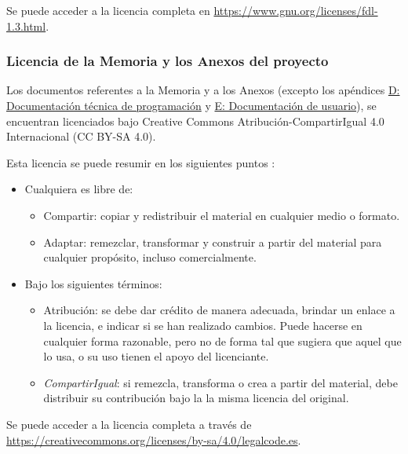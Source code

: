 Se puede acceder a la licencia completa en \href{https://www.gnu.org/licenses/fdl-1.3.html}{https://www.gnu.org/licenses/\newline fdl-1.3.html}.


\subsubsection{Licencia de la Memoria y los Anexos del proyecto}

Los documentos referentes a la Memoria y a los Anexos (excepto los apéndices  \hyperref[apendice:programador]{D:  Documentación técnica de programación} y \hyperref[apendice:usuario]{E: Documentación de usuario}), se encuentran licenciados bajo Creative Commons Atribución-CompartirIgual 4.0 Internacional (CC BY-SA 4.0).

Esta licencia se puede resumir en los siguientes puntos \cite{creative-commons}:

\vspace{-0.2cm}
\begin{itemize} [\textbullet]
	\item Cualquiera es libre de:
	\begin{itemize} [◦]
		\item Compartir: copiar y redistribuir el material en cualquier medio o formato.
		
		\item  Adaptar: remezclar, transformar y construir a partir del material para cualquier propósito, incluso comercialmente. 
	\end{itemize}
	\item Bajo los siguientes términos:
	\begin{itemize} [◦]
		\item Atribución: se debe dar crédito de manera adecuada, brindar un enlace a la licencia, e indicar si se han realizado cambios. Puede hacerse en cualquier forma razonable, pero no de forma tal que sugiera que aquel que lo usa, o su uso tienen el apoyo del licenciante.
		
		\item \emph{CompartirIgual}: si remezcla, transforma o crea a partir del material, debe distribuir su contribución bajo la la misma licencia del original.
	\end{itemize}
\end{itemize}

Se puede acceder a la licencia completa a través de \\ \href{https://creativecommons.org/licenses/by-sa/4.0/legalcode.es}{https://creativecommons.org/licenses/by-sa/4.0/legalcode.es}.